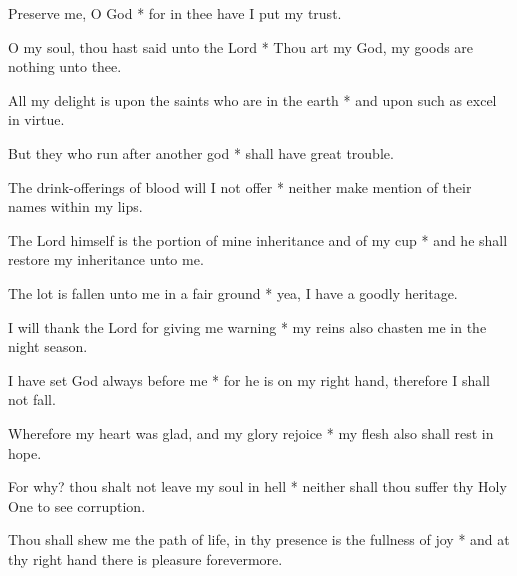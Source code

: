 Preserve me, O God * for in thee have I put my trust.

O my soul, thou hast said unto the Lord * Thou art my God, my goods are nothing unto thee.

All my delight is upon the saints who are in the earth * and upon such as excel in virtue.

But they who run after another god * shall have great trouble.

The drink-offerings of blood will I not offer * neither make mention of their names within my lips.

The Lord himself is the portion of mine inheritance and of my cup * and he shall restore my inheritance unto me.

The lot is fallen unto me in a fair ground * yea, I have a goodly heritage.

I will thank the Lord for giving me warning * my reins also chasten me in the night season.

I have set God always before me * for he is on my right hand, therefore I shall not fall.

Wherefore my heart was glad, and my glory rejoice * my flesh also shall rest in hope.

For why? thou shalt not leave my soul in hell * neither shall thou suffer thy Holy One to see corruption.

Thou shall shew me the path of life, in thy presence is the fullness of joy * and at thy right hand there is pleasure forevermore.